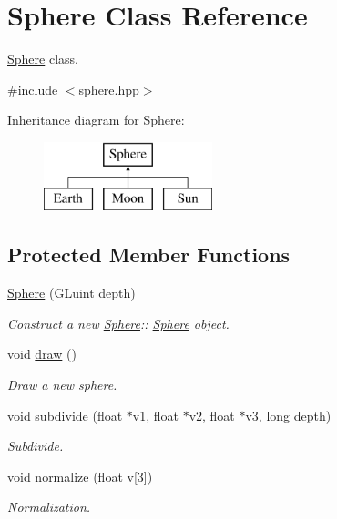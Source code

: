 \hypertarget{classSphere}{}\section{Sphere Class Reference}
\label{classSphere}


\mbox{\hyperlink{classSphere}{Sphere}} class.  




{\ttfamily \#include $<$sphere.\+hpp$>$}

Inheritance diagram for Sphere\+:\begin{figure}[H]
\begin{center}
\leavevmode
\includegraphics[height=2.000000cm]{classSphere}
\end{center}
\end{figure}
\subsection*{Protected Member Functions}
\begin{DoxyCompactItemize}
\item 
\mbox{\hyperlink{classSphere_a1584cdd4253476e77d06f8e60b86da2e}{Sphere}} (G\+Luint depth)
\begin{DoxyCompactList}\small\item\em Construct a new \mbox{\hyperlink{classSphere}{Sphere}}\+:\+: \mbox{\hyperlink{classSphere}{Sphere}} object. \end{DoxyCompactList}\item 
void \mbox{\hyperlink{classSphere_a34a34167b7544c95155d3ff30638d045}{draw}} ()
\begin{DoxyCompactList}\small\item\em Draw a new sphere. \end{DoxyCompactList}\item 
void \mbox{\hyperlink{classSphere_a8ecd1525d70024bb3580215c18d0eae9}{subdivide}} (float $\ast$v1, float $\ast$v2, float $\ast$v3, long depth)
\begin{DoxyCompactList}\small\item\em Subdivide. \end{DoxyCompactList}\item 
void \mbox{\hyperlink{classSphere_a8b5387063d440b1e08d1b2f8ed4358f2}{normalize}} (float v\mbox{[}3\mbox{]})
\begin{DoxyCompactList}\small\item\em Normalization. \end{DoxyCompactList}\end{DoxyCompactItemize}
